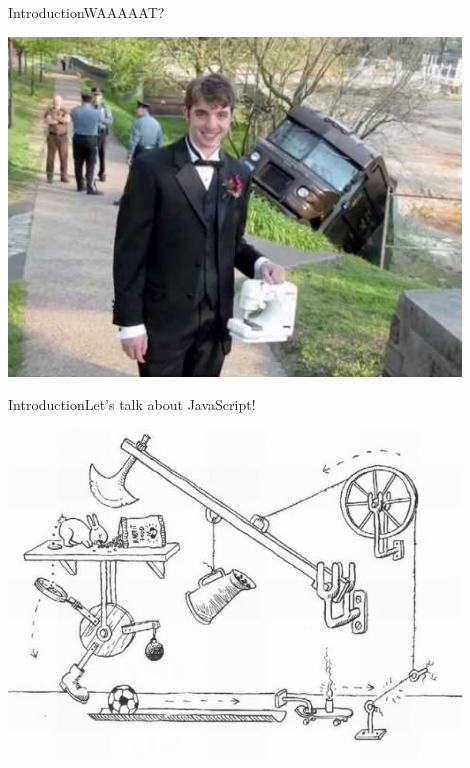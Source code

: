 \documentclass[10pt]{beamer}
\begin{document}
\begin{frame}{Introduction}{WAAAAAT?}
	\begin{center}
		\includegraphics[width=0.9\textwidth]{pictures/wat.jpg}
	\end{center}
\end{frame}


\begin{frame}{Introduction}{Let's talk about JavaScript!}
\begin{center}
	\includegraphics[width=0.9\textwidth]{pictures/shot.jpg}
\end{center}
\end{frame}
\end{document}
